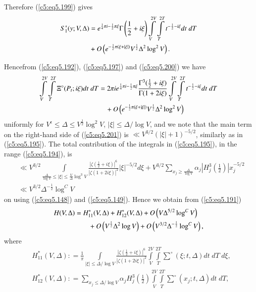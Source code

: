 Therefore (\ref{c5:eq5.199}) gives
\begin{align}
 S^*_1 (y;V,\Delta) &= 
 e^{\frac{1}{4} \pi i -\frac{1}{2} \pi \xi} \Gamma \left(\frac{1}{2}
+ i \xi \right) \int\limits^{2V}_V \int\limits^{2T}_T t^{-\frac{1}{2}
  - i \xi} dt \; dT\notag\\
& + O \left(e^{-\frac{1}{2} \pi (\xi+|\xi|)}
V^{\frac{1}{2}} \Delta^2 \log^2 V\right). \label{c5:eq5.200}
\end{align}

Hence\pageoriginale from (\ref{c5:eq5.192}), (\ref{c5:eq5.197}) and
(\ref{c5:eq5.200}) we have 
\begin{align}
 \int\limits^{2V}_V \int\limits^{2T}_T \Xi^\circ (P_t; i \xi) dt \;
  dT
 & =2 \pi i e^{\frac{1}{4} \pi i - \frac{1}{2} \pi \xi} \frac{\Gamma^3
    (\frac{1}{2} +i \xi)}{\Gamma(1+2 i \xi)} \int\limits^{2V}_V
  \int\limits^{2T}_T t^{-\frac{1}{2} - i \xi} dt \; dT\notag\\
&\quad + O
  \left(e^{-\frac{1}{2} \pi (\xi + |\xi|)} V^{\frac{1}{2}} \Delta^2 \log^2
  V\right)\label{c5:eq5.201}
 \end{align}
uniformly for $V^{\epsilon} \leq \Delta \leq V^{\frac{1}{2}} \log^2
V$, $|\xi| \leq \Delta /\log V$, and we note that the main term on the
right-hand side of (\ref{c5:eq5.201}) is $\ll V^{3/2} (|\xi| +
1)^{-5/2}$, similarly as in (\ref{c5:eq5.195}). The total contribution
of the integrals in (\ref{c5:eq5.195}), in the range
(\ref{c5:eq5.194}), is  
{\fontsize{10}{11}\selectfont
\begin{align*}
&\ll V^{3/2} \int\limits_{\frac{\Delta}{\log V} \leq |\xi| \leq
    \frac{V}{\Delta} \log^3V} \frac{|\zeta(\frac{1}{2} + i
    \xi)|^6}{|\zeta(1+2i\xi)|^2} |\xi|^{-5/2} d \xi + V^{3/2}
  \sum\limits_{x_j \geq \frac{\Delta}{\log V}} \alpha_j |H^3_j
  \left(\frac{1}{2} \right)| x_j^{-5/2}\\ 
&\ll V^{3/2} \Delta^{-\frac{1}{2}} \log^C V
\end{align*}}
on using (\ref{c5:eq5.148}) and (\ref{c5:eq5.149}). Hence we obtain
from (\ref{c5:eq5.191}) 
\begin{align}
H (V,\Delta) &  =  
  H^*_{11} (V,\Delta) + H^*_{12} (V,\Delta) + O \left(V\Delta^{5/2}
  \log^CV\right)\label{c5:eq5.202}\\ 
& \qquad + O \left(V^{\frac{1}{2}} \Delta^2 \log V\right) + O
  \left(V^{3/2} \Delta^{-\frac{1}{2}} \log^C V\right),\notag  
\end{align}
where
{\fontsize{10pt}{12pt}\selectfont
\begin{align}
& H^*_{11} (V,\Delta) : = \frac{1}{\pi} \int\limits_{|\xi| \leq \Delta /
  \log V} \frac{|\zeta (\frac{1}{2} + i \xi)|^6}{|\zeta(1+ 2i \xi)|^2}
\int\limits^{2V}_V \int\limits^{2T}_T \sum\limits^\circ (\xi; t,
\Delta) dt \; dT \; d\xi,\label{c5:eq5.203}\\ 
& H^*_{12} (V,\Delta) : = \sum\limits_{x_j \leq \Delta / \log V}
\alpha_j H^3_j \left(\frac{1}{2} \right) \int\limits^{2V}_V
\int\limits^{2T}_T \sum\limits^\circ (x_j ; t, \Delta) dt \; dT, 
\label{c5:eq5.204}
\end{align}}
